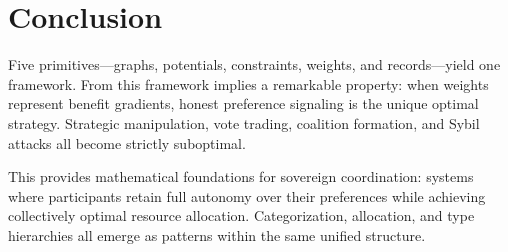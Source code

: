 \documentclass[11pt]{article}
\begin{document}
\section{Conclusion}

Five primitives—graphs, potentials, constraints, weights, and records—yield one framework. From this framework implies a remarkable property: when weights represent benefit gradients, honest preference signaling is the unique optimal strategy. Strategic manipulation, vote trading, coalition formation, and Sybil attacks all become strictly suboptimal.

This provides mathematical foundations for sovereign coordination: systems where participants retain full autonomy over their preferences while achieving collectively optimal resource allocation. Categorization, allocation, and type hierarchies all emerge as patterns within the same unified structure.
\end{document}
